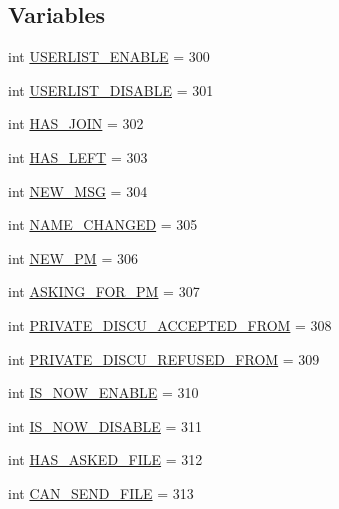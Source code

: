 \subsection*{Variables}
\begin{DoxyCompactItemize}
\item 
int \hyperlink{namespace_server_ad80a48b2e2123c1442355c35e9a12180}{U\+S\+E\+R\+L\+I\+S\+T\+\_\+\+E\+N\+A\+B\+L\+E} = 300
\item 
int \hyperlink{namespace_server_a20a80092be74432cb9d70ee7d69a7897}{U\+S\+E\+R\+L\+I\+S\+T\+\_\+\+D\+I\+S\+A\+B\+L\+E} = 301
\item 
int \hyperlink{namespace_server_a6d93191ccb1aca72fc4e4c35df44dc54}{H\+A\+S\+\_\+\+J\+O\+I\+N} = 302
\item 
int \hyperlink{namespace_server_a30d806240b31876a27ec926941c45c7b}{H\+A\+S\+\_\+\+L\+E\+F\+T} = 303
\item 
int \hyperlink{namespace_server_a6403a5757be6c8ca9123c4a1d84fcf8f}{N\+E\+W\+\_\+\+M\+S\+G} = 304
\item 
int \hyperlink{namespace_server_a74a7d4ecad24b92d3e58fa6935bf4738}{N\+A\+M\+E\+\_\+\+C\+H\+A\+N\+G\+E\+D} = 305
\item 
int \hyperlink{namespace_server_a5baa396c48e11763e3a9e6b7949c848c}{N\+E\+W\+\_\+\+P\+M} = 306
\item 
int \hyperlink{namespace_server_a0a4c647255674a0b8b88b4e0352735b8}{A\+S\+K\+I\+N\+G\+\_\+\+F\+O\+R\+\_\+\+P\+M} = 307
\item 
int \hyperlink{namespace_server_a7ed9c5c7a5d63ed69e59b8e1facf1941}{P\+R\+I\+V\+A\+T\+E\+\_\+\+D\+I\+S\+C\+U\+\_\+\+A\+C\+C\+E\+P\+T\+E\+D\+\_\+\+F\+R\+O\+M} = 308
\item 
int \hyperlink{namespace_server_a1893bf20254e625ee4d337b5ac4c0c7c}{P\+R\+I\+V\+A\+T\+E\+\_\+\+D\+I\+S\+C\+U\+\_\+\+R\+E\+F\+U\+S\+E\+D\+\_\+\+F\+R\+O\+M} = 309
\item 
int \hyperlink{namespace_server_a706046d1323e6c8efcf412f039468feb}{I\+S\+\_\+\+N\+O\+W\+\_\+\+E\+N\+A\+B\+L\+E} = 310
\item 
int \hyperlink{namespace_server_ad86289daa647c23b114d6eeecb311b74}{I\+S\+\_\+\+N\+O\+W\+\_\+\+D\+I\+S\+A\+B\+L\+E} = 311
\item 
int \hyperlink{namespace_server_a948cf317958301749b5133cb0e429cbf}{H\+A\+S\+\_\+\+A\+S\+K\+E\+D\+\_\+\+F\+I\+L\+E} = 312
\item 
int \hyperlink{namespace_server_a0e574da7da6c6fa749d02202b36efae4}{C\+A\+N\+\_\+\+S\+E\+N\+D\+\_\+\+F\+I\+L\+E} = 313
\item 

\end{DoxyCompactItemize}
